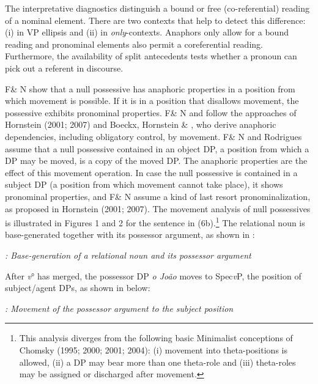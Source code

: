 \documentclass[output=paper]{langsci/langscibook}
\begin{document}
The interpretative diagnostics distinguish a bound or free (co-referential) reading of a nominal element. There are two contexts that help to detect this difference: (i) in VP ellipsis and (ii) in \textit{only}{}-contexts. Anaphors only allow for a bound reading and pronominal elements also permit a coreferential reading. Furthermore, the availability of split antecedents tests whether a pronoun can pick out a referent in discourse.

F\& N show that a null possessive has anaphoric properties in a position from which movement is possible. If it is in a position that disallows movement, the possessive exhibits pronominal properties. F\& N and \citet{Rodrigues2010} follow the approaches of Hornstein (2001; 2007) and Boeckx, Hornstein \& \citet{Nunes2010}, who derive anaphoric dependencies, including obligatory control, by movement. F\& N and Rodrigues assume that a null possessive contained in an object DP, a position from which a DP may be moved, is a copy of the moved DP. The anaphoric properties are the effect of this movement operation. In case the null possessive is contained in a subject DP (a position from which movement cannot take place), it shows pronominal properties, and F\& N assume a kind of last resort pronominalization, as proposed in Hornstein (2001; 2007). The movement analysis of null possessives is illustrated in Figures 1 and 2 for the sentence in (6b).\footnote{This analysis diverges from the following basic Minimalist conceptions of Chomsky (1995; 2000; 2001; 2004): (i) movement into theta-positions is allowed, (ii) a DP may bear more than one theta-role and (iii) theta-roles may be assigned or discharged after movement.}\textsuperscript{} The relational noun is base-generated together with its possessor argument, as shown in :

 

\textit{: Base-generation of a relational noun and its possessor argument}

After \textit{v}° has merged, the possessor DP \textit{o João} moves to Spec\textit{v}P, the position of subject/agent DPs, as shown in  below:

 

\textit{: Movement of the possessor argument to the subject position}
\end{document}
